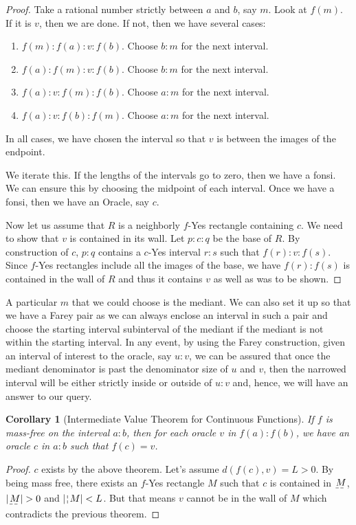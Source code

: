 \documentclass[12pt]{article}
\newtheorem{corollary}{Corollary}[subsection]
\begin{document}
\begin{proof}
Take a rational number strictly between $a$ and $b$, say $m$. Look at $f(m)$. If it is $v$, then we are done. If not, then we have several cases: 
\begin{enumerate}
\item $f(m):f(a):v:f(b)$. Choose $b:m$ for the next interval.
\item $f(a):f(m):v:f(b)$. Choose $b:m$ for the next interval. 
\item $f(a):v:f(m):f(b)$. Choose $a:m$ for the next interval.
\item $f(a):v:f(b):f(m)$. Choose $a:m$ for the next interval. 
\end{enumerate}
In all cases, we have chosen the interval so that $v$ is between the images of the endpoint. 

We iterate this. If the lengths of the intervals go to zero, then we have a fonsi. We can ensure this by choosing the midpoint of each interval. Once we have a fonsi, then we have an Oracle, say $c$. 

Now let us assume that $R$ is a neighborly $f$-Yes rectangle containing $c$. We need to show that $v$ is contained in its wall. Let $p:c:q$ be the base of $R$. By construction of $c$, $p:q$ contains a $c$-Yes interval $r:s$ such that $f(r):v:f(s)$. Since $f$-Yes rectangles include all the images of the base, we have $f(r):f(s)$ is contained in the wall of $R$ and thus it contains $v$ as well as was to be shown. 
\end{proof}

A particular $m$ that we could choose is the mediant. We can also set it up so that we have a Farey pair as we can always enclose an interval in such a pair and choose the starting interval subinterval of the mediant if the mediant is not within the starting interval. In any event, by using the Farey construction, given an interval of interest to the oracle, say $u:v$, we can be assured that once the mediant denominator is past the denominator size of $u$ and $v$, then the narrowed interval will be either strictly inside or outside of $u:v$ and, hence, we will have an answer to our query. 

\begin{corollary}[Intermediate Value Theorem for Continuous Functions]
If $f$ is mass-free on the interval $a:b$, then for each oracle $v$ in $f(a):f(b)$, we have an oracle $c$ in $a:b$ such that $f(c)=v$.
\end{corollary}

\begin{proof}
$c$ exists by the above theorem. Let's assume $d(f(c), v) = L > 0$. By being mass free, there exists an $f$-Yes rectangle $M$ such that $c$ is contained in $\base{M}$, $|\base{M}| > 0$ and $|\wall{M}| < L$. But that means $v$ cannot be in the wall of $M$ which contradicts the previous theorem. 
\end{proof}
    
\end{document}

